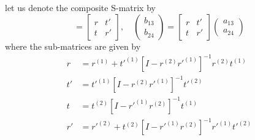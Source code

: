 \documentclass[11pt,a4paper]{book}
\theoremstyle{plain}
\theoremstyle{definition}
\theoremstyle{remark}
\begin{document}
let us denote the composite S-matrix by
\begin{equation}
    [S] =
    \begin{bmatrix}
        r & t' \\
        t & r'
    \end{bmatrix}, \quad
    \begin{pmatrix}
        b_{13} \\
        b_{24}
    \end{pmatrix}
    =
    \begin{bmatrix}
        r & t' \\
        t & r'
    \end{bmatrix}
    \begin{pmatrix}
        a_{13} \\
        a_{24}
    \end{pmatrix}
\end{equation}
where the sub-matrices are given by
\begin{equation} \label{eq:compositeS}
    \begin{aligned}
        r & = r^{(1)} + t'^{(1)} [I - r^{(2)} r'^{(1)}]^{-1} r^{(2)} t^{(1)} \\
        t' & = t'^{(1)} [I - r^{(2)} r'^{(1)}]^{-1} t'^{(2)} \\
        t & = t^{(2)} [I - r'^{(1)} r^{(2)}]^{-1} t^{(1)} \\
        r' & = r'^{(2)} + t^{(2)} [I - r'^{(1)} r^{(2)}]^{-1} r'^{(1)} t'^{(2)}
    \end{aligned}
\end{equation}
\end{document}
